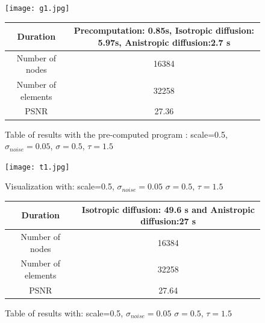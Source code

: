 \documentclass{report}
\begin{document}
 \begin{figure}[h!]
 	\label{g1}
 	\centering
 	\texttt{[image: g1.jpg]}
 \end{figure}
 
 
 
          \begin{figure}[h!]
          	\centering
          	\label{T2}
          	\begin{tabular}{|c|c|}
          		\hline
          		Duration &  Precomputation: 0.85s,
          		Isotropic diffusion: 5.97s,
          		Anistropic diffusion:2.7 s   \\
          		\hline
          		Number of nodes & 16384 \\
          		\hline
          		Number of elements & 32258\\
          		
          		\hline
          		PSNR & 27.36 \\
          		\hline
          	\end{tabular}
          	\caption{Table of results with the pre-computed program : scale=0.5, $\sigma_{noise}=0.05$, $\sigma=0.5$, $\tau=1.5$ }
          \end{figure}
          
          
          \begin{figure}[h!]
          	\centering
          	\label{t1}
          	\caption{Visualization with: scale=0.5, $\sigma_{noise}=0.05$  $\sigma=0.5$, $\tau=1.5$ }
          	\texttt{[image: t1.jpg]}
          \end{figure}
          
          \begin{figure}[h!]
          	\caption{Table of results with: scale=0.5, $\sigma_{noise}=0.05$  $\sigma=0.5$, $\tau=1.5$ }
          	\centering
          	\label{T1}
          	\begin{tabular}{|c|c|}
          		\hline
          		Duration &  Isotropic diffusion: 49.6 s
          		and Anistropic diffusion:27 s   \\
          		\hline
          		Number of nodes & 16384 \\
          		\hline
          		Number of elements & 32258\\
          		\hline
          		PSNR & 27.64\\
          		\hline
          	\end{tabular}
          \end{figure}
          
\end{document}
